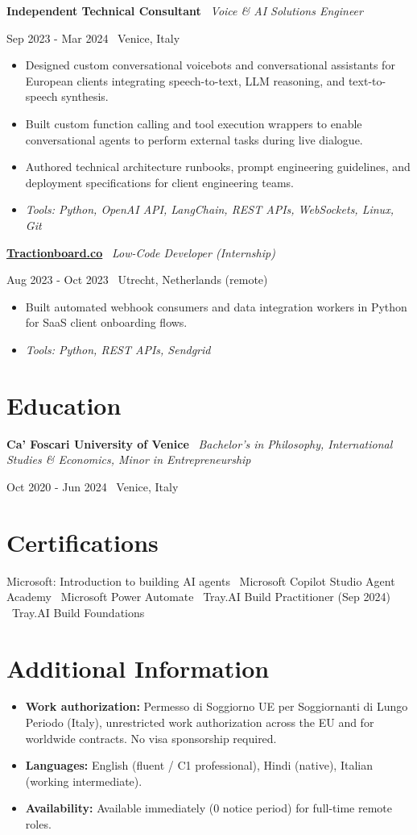 \documentclass[a4paper,10pt]{article}
\newcommand{\role}[4]{%
  \vspace{2pt}\noindent
  \begin{minipage}[t]{0.70\textwidth}\raggedright\textbf{#1} \textbullet\ \textit{#3}\end{minipage}%
  \hfill
  \begin{minipage}[t]{0.28\textwidth}\raggedleft\footnotesize\color{gray}#2 \textbullet\ #4\end{minipage}%
  \vspace{1pt}%
}
\begin{document}
\role{Independent Technical Consultant}{Sep 2023 - Mar 2024}{Voice \& AI Solutions Engineer}{Venice, Italy}
\begin{itemize}
  \item Designed custom conversational voicebots and conversational assistants for European clients integrating speech-to-text, LLM reasoning, and text-to-speech synthesis.
  \item Built custom function calling and tool execution wrappers to enable conversational agents to perform external tasks during live dialogue.
  \item Authored technical architecture runbooks, prompt engineering guidelines, and deployment specifications for client engineering teams.
  \item \textit{Tools: Python, OpenAI API, LangChain, REST APIs, WebSockets, Linux, Git}
\end{itemize}

\role{\href{https://tractionboard.co}{Tractionboard.co}}{Aug 2023 - Oct 2023}{Low-Code Developer (Internship)}{Utrecht, Netherlands (remote)}
\begin{itemize}
  \item Built automated webhook consumers and data integration workers in Python for SaaS client onboarding flows.
  \item \textit{Tools: Python, REST APIs, Sendgrid}
\end{itemize}

\section{Education}
\role{Ca' Foscari University of Venice}{Oct 2020 - Jun 2024}{Bachelor's in Philosophy, International Studies \& Economics, Minor in Entrepreneurship}{Venice, Italy}

\section{Certifications}
Microsoft: Introduction to building AI agents \textbullet\ Microsoft Copilot Studio Agent Academy \textbullet\ Microsoft Power Automate \textbullet\ Tray.AI Build Practitioner (Sep 2024) \textbullet\ Tray.AI Build Foundations

\section{Additional Information}
\begin{itemize}
  \item \textbf{Work authorization:} Permesso di Soggiorno UE per Soggiornanti di Lungo Periodo (Italy), unrestricted work authorization across the EU and for worldwide contracts. No visa sponsorship required.
  \item \textbf{Languages:} English (fluent / C1 professional), Hindi (native), Italian (working intermediate).
  \item \textbf{Availability:} Available immediately (0 notice period) for full-time remote roles.
\end{itemize}
\end{document}
